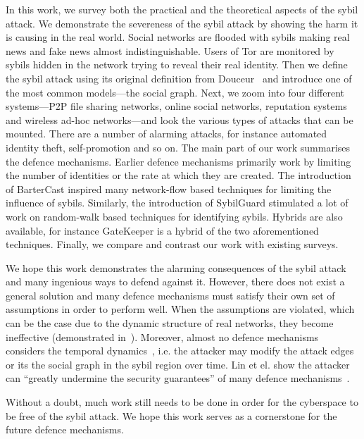 In this work, we survey both the practical and the theoretical aspects of the
sybil attack. We demonstrate the severeness of the sybil attack by showing the
harm it is causing in the real world. Social networks are flooded with sybils
making real news and fake news almost indistinguishable. Users of Tor are
monitored by sybils hidden in the network trying to reveal their real identity.
Then we define the sybil attack using its original definition from
Douceur~\cite{douceur2002sybil} and introduce one of the most common
models---the social graph. Next, we zoom into four different systems---P2P file
sharing networks, online social networks, reputation systems and wireless ad-hoc
networks---and look the various types of attacks that can be mounted. There are
a number of alarming attacks, for instance automated identity theft,
self-promotion and so on. The main part of our work summarises the defence
mechanisms. Earlier defence mechanisms primarily work by limiting the number of
identities or the rate at which they are created. The introduction of BarterCast
inspired many network-flow based techniques for limiting the influence of
sybils. Similarly, the introduction of SybilGuard stimulated a lot of work on
random-walk based techniques for identifying sybils. Hybrids are also available,
for instance GateKeeper is a hybrid of the two aforementioned techniques.
Finally, we compare and contrast our work with existing surveys.

We hope this work demonstrates the alarming consequences of the sybil attack and
many ingenious ways to defend against it. However, there does not exist a
general solution and many defence mechanisms must satisfy their own set of
assumptions in order to perform well. When the assumptions are violated, which
can be the case due to the dynamic structure of real networks, they become
ineffective (demonstrated in~\cite{liu2016smartwalk}). Moreover, almost no
defence mechanisms considers the temporal dynamics~\cite{liu2015exploiting},
i.e. the attacker may modify the attack edges or its the social graph in the
sybil region over time. Lin et el. show the attacker can ``greatly undermine the
security guarantees'' of many defence mechanisms~\cite{liu2015exploiting}.

Without a doubt, much work still needs to be done in order for the cyberspace to
be free of the sybil attack. We hope this work serves as a cornerstone for the
future defence mechanisms.


